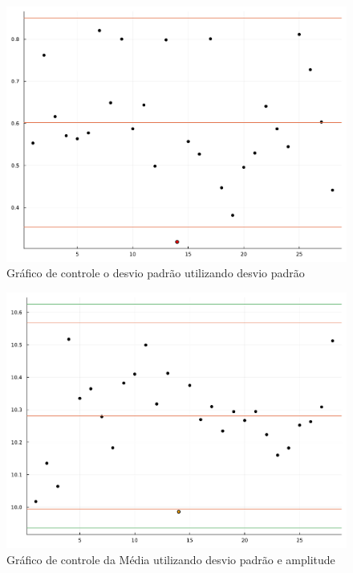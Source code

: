 \documentclass[
  letterpaper,
  DIV=11,
  numbers=noendperiod]{scrartcl}
\begin{document}
\begin{figure}

{\centering \includegraphics{trabalho1_files/figure-pdf/fig4-output-1.pdf}

}

\caption{Gráfico de controle o desvio padrão utilizando desvio padrão}

\end{figure}

\begin{figure}

{\centering \includegraphics{trabalho1_files/figure-pdf/fig5-output-1.pdf}

}

\caption{Gráfico de controle da Média utilizando desvio padrão e
amplitude}

\end{figure}
\end{document}
